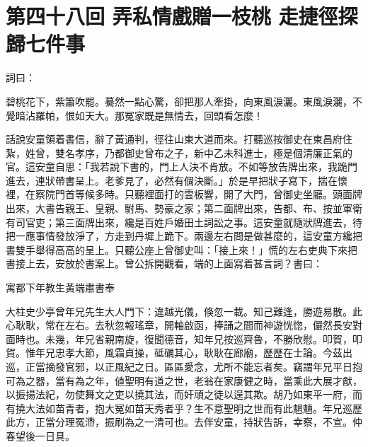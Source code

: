 
\chapter*{第四十八回 弄私情戲贈一枝桃 走捷徑探歸七件事}


詞曰：

\begin{myquote}
碧桃花下，紫簫吹罷。驀然一點心驚，卻把那人牽掛，向東風淚灑。東風淚灑，不覺暗沾羅帕，恨如天大。那冤家既是無情去，回頭看怎麼！

\end{myquote}

話說安童領着書信，辭了黃通判，徑往山東大道而來。打聽巡按御史在東昌府住紮，姓曾，雙名孝序，乃都御史曾布之子，新中乙未科進士，極是個清廉正氣的官。這安童自思：「我若說下書的，門上人決不肯放。不如等放告牌出來，我跪門進去，連狀帶書呈上。老爹見了，必然有個決斷。」於是早把狀子寫下，揣在懷裡，在察院門首等候多時。只聽裡面打的雲板響，開了大門，曾御史坐廳。頭面牌出來，大書告親王、皇親、駙馬、勢豪之家；{}第二面牌出來，告都、布、按並軍衛有司官吏；第三面牌出來，纔是百姓戶婚田土詞訟之事。這安童就隨狀牌進去，待把一應事情發放淨了，方走到丹墀上跪下。兩邊左右問是做甚麼的，這安童方纔把書雙手舉得高高的呈上。只聽公座上曾御史叫：「接上來！」慌的左右吏典下來把書接上去，安放於書案上。曾公拆開觀看，端的上面寫着甚言詞？書曰：

\begin{myquote}[\markfont]
寓都下年教生黃端肅書奉

大柱史少亭曾年兄先生大人門下：違越光儀，倏忽一載。知己難逢，勝遊易散。此心耿耿，常在左右。去秋忽報瑤章，開軸啟函，捧誦之間而神遊恍惚，儼然長安對面時也。未幾，年兄省親南旋，復聞德音，知年兄按巡齊魯，不勝欣慰。叩賀，叩賀。惟年兄忠孝大節，風霜貞操，砥礪其心，耿耿在廊廟，歷歷在士論。今茲出巡，正當摘發官邪，以正風紀之日。區區愛念，尤所不能忘者矣。竊謂年兄平日抱可為之器，當有為之年，値聖明有道之世，老翁在家康健之時，當乘此大展才猷，以振揚法紀，勿使舞文之吏以撓其法，而奸頑之徒以逞其欺。胡乃如東平一府，而有撓大法如苗青者，抱大冤如苗天秀者乎？生不意聖明之世而有此魍魎。年兄巡歷此方，正當分理冤滯，振刷為之一清可也。去伴安童，持狀告訴，幸察，不宣。仲春望後一日具。
\end{myquote}

